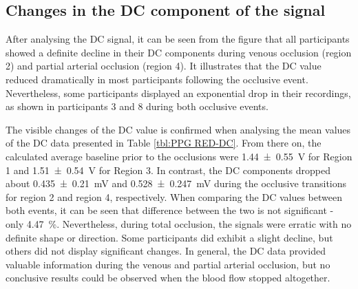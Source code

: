 \subsection{Changes in the DC component of the signal}
\label{section comparison 4.1}
After analysing the DC signal, it can be seen from the figure that all participants showed a definite decline in their DC components during venous occlusion (region 2) and partial arterial occlusion (region 4). It illustrates that the DC value reduced dramatically in most participants following the occlusive event. Nevertheless, some participants displayed an exponential drop in their recordings, as shown in participants 3 and 8 during both occlusive events. 

The visible changes of the DC value is confirmed when analysing the mean values of the DC data presented in Table \ref{tbl:PPG RED-DC}. From there on, the calculated average baseline prior to the occlusions were \SI{1.44(055)}{\volt} for Region 1 and \SI{1.51(054)}{\volt} for Region 3.  In contrast, the DC components dropped about \SI{0.435(0210)}{\milli\volt} and \SI{0.528(0247)}{\milli\volt} during the occlusive transitions for region 2 and region 4, respectively. When comparing the DC values between both events, it can be seen that difference between the two is not significant - only \SI{4.47}{\percent}. Nevertheless, during total occlusion, the signals were erratic with no definite shape or direction. Some participants did exhibit a slight decline, but others did not display significant changes. In general, the DC data provided valuable information during the venous and partial arterial occlusion, but no conclusive results could be observed when the blood flow stopped altogether. 

